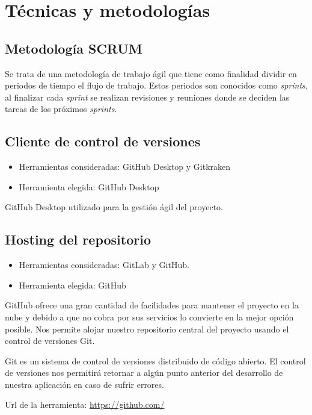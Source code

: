 
\section{Técnicas y metodologías}

\subsection{Metodología SCRUM}
Se trata de una metodología de trabajo ágil que tiene como finalidad dividir en periodos de tiempo el flujo de trabajo. Estos periodos son conocidos como  \textit{sprints}, al finalizar cada \textit{sprint} se realizan revisiones y reuniones donde se deciden las tareas de los próximos \textit{sprints}.

\subsection{Cliente de control de versiones}
\begin{itemize}
\item Herramientas consideradas: GitHub Desktop y Gitkraken
\item Herramienta elegida: GitHub Desktop
\end{itemize}

GitHub Desktop utilizado para la gestión ágil del proyecto.

\subsection{Hosting del repositorio}
\begin{itemize}
\item Herramientas consideradas: GitLab y GitHub.
\item Herramienta elegida: GitHub
\end{itemize}

GitHub ofrece una gran cantidad de facilidades para mantener el proyecto en la nube y debido a que no cobra por sus servicios lo convierte en la mejor opción posible. Nos permite alojar nuestro repositorio central del proyecto usando el control de versiones Git.

Git es un sistema de control de versiones distribuido de código abierto.
El control de versiones nos permitirá retornar a algún punto anterior del desarrollo de nuestra aplicación en caso de sufrir errores.

Url de la herramienta: \url{https://github.com/}


